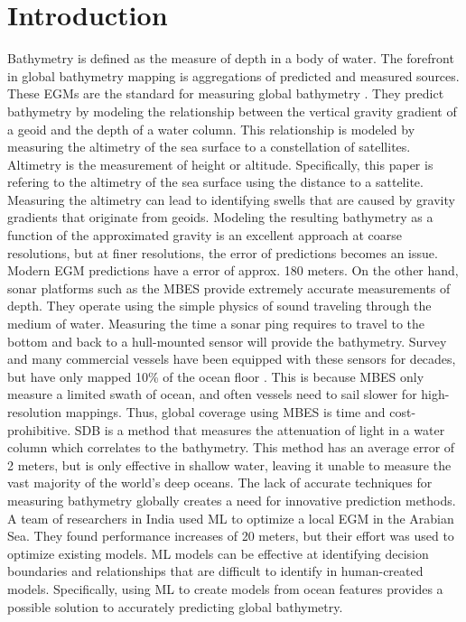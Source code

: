 \section{Introduction}
\setlength{\parindent}{10ex}
Bathymetry is defined as the measure of depth in a body of water.
The forefront in global bathymetry mapping is aggregations of predicted and measured sources. 
These \ac{EGM}s are the standard for measuring global bathymetry \cite{becker2009global}\cite{smith1994bathymetric}\cite{smith1997global}\cite{smith2010planning}.
They predict bathymetry by modeling the relationship between the vertical gravity gradient of a geoid and the depth of a water column.
This relationship is modeled by measuring the altimetry of the sea surface to a constellation of satellites.
Altimetry is the measurement of height or altitude. 
Specifically, this paper is refering to the altimetry of the sea surface using the distance to a sattelite.
Measuring the altimetry can lead to identifying swells that are caused by gravity gradients that originate from geoids.
Modeling the resulting bathymetry as a function of the approximated gravity is an excellent approach at coarse resolutions, but at finer resolutions, the error of predictions becomes an issue.
Modern \ac{EGM} predictions have a error of approx. 180 meters.
On the other hand, sonar platforms such as the \ac{MBES} \cite{farr1980multibeam} provide extremely accurate measurements of depth. 
They operate using the simple physics of sound traveling through the medium of water.
Measuring the time a sonar ping requires to travel to the bottom and back to a hull-mounted sensor will provide the bathymetry.
Survey and many commercial vessels have been equipped with these sensors for decades, but have only mapped 10\% of the ocean floor \cite{becker2009global}.
This is because \ac{MBES} only measure a limited swath of ocean, and often vessels need to sail slower for high-resolution mappings.
Thus, global coverage using \ac{MBES} is time and cost-prohibitive.
\ac{SDB} is a method that measures the attenuation of light in a water column which correlates to the bathymetry.
This method has an average error of 2 meters, but is only effective in shallow water, leaving it unable to measure the vast majority of the world's deep oceans.
The lack of accurate techniques for measuring bathymetry globally creates a need for innovative prediction methods.
A team of researchers in India \cite{jena2012prediction} used \ac{ML} to optimize a local \ac{EGM} in the Arabian Sea.
They found performance increases of 20 meters, but their effort was used to optimize existing models.
\ac{ML} models can be effective at identifying decision boundaries and relationships that are difficult to identify in human-created models.
Specifically, using \ac{ML} to create models from ocean features provides a possible solution to accurately predicting global bathymetry.

